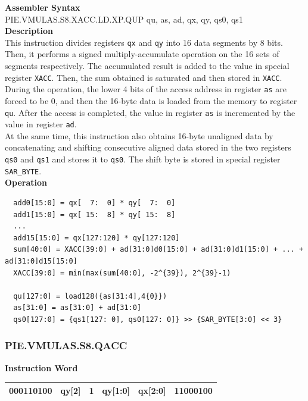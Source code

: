 \textbf{Assembler Syntax} \\
PIE.VMULAS.S8.XACC.LD.XP.QUP qu, as, ad, qx, qy, qs0, qs1 \\
\textbf{Description} \\
This instruction divides registers \lstinline{qx} and \lstinline{qy} into 16 data segments by 8 bits. Then, it performs a signed multiply-accumulate operation on the 16 sets of segments respectively. The accumulated result is added to the value in special register \lstinline{XACC}. Then, the sum obtained is saturated and then stored in \lstinline{XACC}.\\
During the operation, the lower 4 bits of the access address in register \lstinline{as} are forced to be 0, and then the 16-byte data is loaded from the memory to register \lstinline{qu}. After the access is completed, the value in register \lstinline{as} is incremented by the value in register \lstinline{ad}.\\
At the same time, this instruction also obtains 16-byte unaligned data by concatenating and shifting consecutive aligned data stored in the two registers \lstinline{qs0} and \lstinline{qs1} and stores it to \lstinline{qs0}. The shift byte is stored in special register \lstinline{SAR_BYTE}.\\
\textbf{Operation}
\begin{lstlisting}
  add0[15:0] = qx[  7:  0] * qy[  7:  0]
  add1[15:0] = qx[ 15:  8] * qy[ 15:  8]
  ...
  add15[15:0] = qx[127:120] * qy[127:120]
  sum[40:0] = XACC[39:0] + ad[31:0]d0[15:0] + ad[31:0]d1[15:0] + ... + ad[31:0]d15[15:0]
  XACC[39:0] = min(max(sum[40:0], -2^{39}), 2^{39}-1)

  qu[127:0] = load128({as[31:4],4{0}})
  as[31:0] = as[31:0] + ad[31:0]
  qs0[127:0] = {qs1[127: 0], qs0[127: 0]} >> {SAR_BYTE[3:0] << 3}
\end{lstlisting}

\newpage
\subsubsection{PIE.VMULAS.S8.QACC}\label{instruction:PIEVMULASS8QACC}
\setlength\tabcolsep{6pt}
\textbf{Instruction Word} \\
\begin{tabular}{|c|c|c|c|c|c|}
	\hline
	000110100 & qy[2] & 1 & qy[1:0] & qx[2:0] & 11000100 \\
	\hline
\end{tabular}

